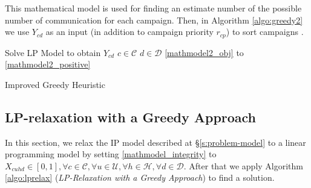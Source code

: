 \documentclass[11pt]{article}
\begin{document}
This mathematical model is used for finding an estimate number of the possible number of communication for each campaign. Then, in Algorithm \ref{algo:greedy2} we use $Y_{{c}{d}}$ as an input (in addition to campaign priority $r_{{c}{p}}$) to sort campaigns .

\begin{singlespace}
\begin{algorithm}[H]
\DontPrintSemicolon
{}

Solve LP Model to obtain $Y_{{c}{d}}$ $c\in\mathcal{C}$ $d\in\mathcal{D}$
\eqref{mathmodel2_obj} to \eqref{mathmodel2_positive}

\caption{Improved Greedy Heuristic}
\label{algo:greedy2}
\end{algorithm}
\end{singlespace}

\subsection{LP-relaxation with a Greedy Approach} \label{s:lp_relaxation_heuristic}
In this section, we relax the IP model described at \S \ref{s:problem-model} to a linear programming model by setting \eqref{mathmodel_integrity} to $X_{{c}{u}{h}{d}} \in [0,1],\forall c \in \mathcal{C}, \forall u \in \mathcal{U}, \forall h \in \mathcal{H}, \forall d \in \mathcal{D}$. After that we apply Algorithm \ref{algo:lprelax} (\textit{LP-Relaxation with a Greedy Approach}) to find a solution.\\
\end{document}
